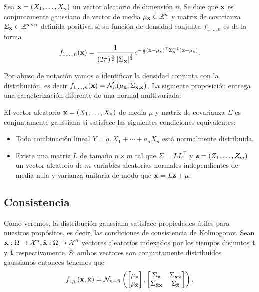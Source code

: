 \begin{definition}
	Sea \(\mathbf{x} = (X_1, \dotsc, X_n)\) un vector aleatorio de dimensión \(n\). Se dice que \(\mathbf{x}\) es conjuntamente gaussiano de vector de media \(\mu_{\mathbf{x}} \in \mathbb{R}^n\) y matriz de covarianza \(\Sigma_{\mathbf{x}} \in \mathbb{R}^{n \times n}\) definida positiva, si su función de densidad conjunta \(f_{1, \dotsc, n}\) es de la forma
	\begin{equation*}
		f_{1, \dotsc, n}(\mathbf{x}) = \frac{1}{(2 \pi)^{\frac{n}{2}} \left\vert \Sigma_{\mathbf{x}} \right\vert^{\frac{1}{2}}} e^{-\frac{1}{2} (\mathbf{x} - \mu_{\mathbf{x}})^\top \Sigma_{\mathbf{x}}^{-1} (\mathbf{x} - \mu_{\mathbf{x}})}.
	\end{equation*}
\end{definition}
Por abuso de notación vamos a identificar la densidad conjunta con la distribución, es decir \(f_{1, \dotsc, n}(\mathbf{x}) = \mathcal{N}_{n} (\mu_{\mathbf{x}}, \Sigma_{\mathbf{x},\mathbf{x}})\). La siguiente proposición entrega una caracterización diferente de una normal multivariada:
\begin{proposition}
	El vector aleatorio \(\mathbf{x} = (X_1, \dotsc, X_n)\) de media \(\mu\) y matriz de covarianza \(\Sigma\) es conjuntamente gaussiana si satisface las siguientes condiciones equivalentes:
	\begin{itemize}
		\item Toda combinación lineal \(Y = a_1 X_1 + \dotsb + a_n X_n\) está normalmente distribuida.
		\item Existe una matriz \(L\) de tamaño \(n \times m\) tal que \(\Sigma = LL^\top\) y \(\mathbf{z} = (Z_1, \dotsc, Z_m)\) un vector aleatorio de \(m\) variables aleatorias normales independientes de media nula y varianza unitaria de modo que \(\mathbf{x} = L \mathbf{z} + \mu\).
	\end{itemize}
\end{proposition}
\subsection{Consistencia}

Como veremos, la distribución gaussiana satisface propiedades útiles para nuestros propósitos, es decir, las condiciones de consistencia de Kolmogorov. Sean \(\mathbf{x} : \Omega \to \mathcal{X}^n, \bar{\mathbf{x}} : \Omega \to \mathcal{X}^{\bar{n}}\) vectores aleatorios indexados por los tiempos disjuntos \(\mathbf{t}\) y \(\bar{\mathbf{t}}\) respectivamente. Si ambos vectores son conjuntamente distribuidos gaussianos entonces tenemos que
\begin{equation*}
	f_{\mathbf{t}, \bar{\mathbf{t}}} \left(\mathbf{x}, \bar{\mathbf{x}}\right) = \mathcal{N}_{n + \bar{n}} \left( \begin{bmatrix} \mu_{\mathbf{x}} \\ \mu_{\bar{\mathbf{x}}} \end{bmatrix},
	\begin{bmatrix}
		\Sigma_{\mathbf{x}} & \Sigma_{\mathbf{x} \bar{\mathbf{x}}} \\
		\Sigma_{\bar{\mathbf{x}} \mathbf{x}} & \Sigma_{\bar{\mathbf{x}}}
	\end{bmatrix} \right).
\end{equation*}

